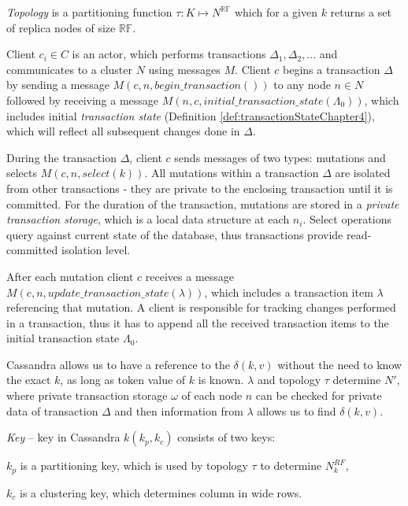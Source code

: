 \documentclass[runningheads,a4paper]{llncs}
\newcommand{\nodes}{$\mathit{N}$\xspace}
\newcommand{\transaction}{$\Delta$\xspace}
\newcommand{\beginTransactionMessage}{$\mathit{M}(c, n, \mathit{begin\_transaction}())$\xspace}
\newcommand{\initialTxStateMessage}{$\mathit{M}(n, c, \mathit{initial\_transaction\_state}(\Lambda_{0}))$\xspace}
\newcommand{\selectMessage}{$\mathit{M}(c,n,select(k))$\xspace}
\newcommand{\updateTxStateMessage}{$\mathit{M}(c, n, \mathit{update\_transaction\_state}(\lambda))$\xspace}
\newcommand{\mutation}[2]{$\delta(#1, #2)$\xspace}
\newcommand{\topology}{$\tau$\xspace}
\newcommand{\txItem}{$\lambda$\xspace}
\newcommand{\txStatei}[1]{$\Lambda_{#1}$\xspace}
\newcommand{\txStorage}{$\omega$\xspace}
\newcommand{\client}{$c$\xspace}
\newcommand{\node}[1]{$n_{#1}$\xspace}
\begin{document}
\begin{definition}
  \label{def:topology}
  \emph{Topology} is a partitioning function $\tau:\mathit{K} \mapsto \mathit{N}^{\mathbb{RF}}$ which for a given $k$ returns a set of replica nodes of size $\mathbb{RF}$. 
\end{definition}

Client $c_{i}\in\mathit{C}$ is an actor, which performs transactions $\Delta_{1}, \Delta_{2}, ...$ and communicates to a cluster \nodes using messages $\mathit{M}$. Client \client begins a transaction \transaction by sending a message \beginTransactionMessage to any node $n\in\mathit{N}$ followed by receiving a message \initialTxStateMessage, which includes initial \emph{transaction state} (Definition \ref{def:transactionStateChapter4}), which will reflect all subsequent changes done in \transaction.

During the transaction \transaction, client \client sends messages of two types: mutations and selects \selectMessage. All mutations within a transaction \transaction are isolated from other transactions - they are private to the enclosing transaction until it is committed. For the duration of the transaction, mutations are stored in a \emph{private transaction storage}, which is a local data structure at each \node{i}. Select operations query against current state of the database, thus transactions provide read-committed isolation level. 

After each mutation client \client receives a message \updateTxStateMessage, which includes a transaction item \txItem referencing that mutation. A client is responsible for tracking changes performed in a transaction, thus it has to append all the received transaction items to the initial transaction state \txStatei{0}.

Cassandra allows us to have a reference to the \mutation{k}{v} without the need to know the exact $k$, as long as token value of $k$ is known. \txItem and topology \topology determine $N'$, where private transaction storage \txStorage of each node $n$ can be checked for private data of transaction \transaction and then information from \txItem allows us to find \mutation{k}{v}.

\begin{definition}
  \label{def:keyCassandra}
  \emph{Key} -- key in Cassandra $k(k_p,k_c)$ consists of two keys: 
  \begin{enumerate*}[label=\alph*)]
    \item $k_p$ is a partitioning key, which is used by topology \topology to determine $\mathit{N}^{RF}_k$,
    \item $k_c$ is a clustering key, which determines column in wide rows.
  \end{enumerate*}
\end{definition}
\end{document}
